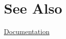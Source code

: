 \documentclass{article}
\begin{document}
% 
% 
% 
% 
% 
% 

\section*{See Also}
\href{\kmlroot/contents.html}{Documentation}




\end{document}
